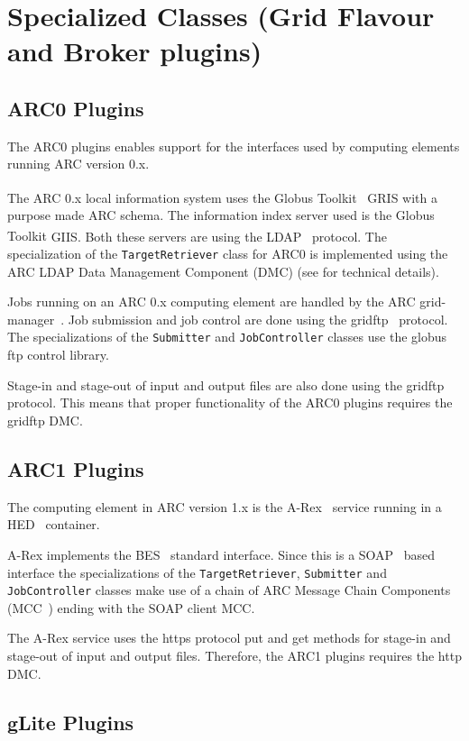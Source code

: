 \documentclass{book}
\newcommand{\GT}{Globus Toolkit\textsuperscript{\textregistered}}
\newcommand{\JobController}{\texttt{JobController}}
\newcommand{\TargetRetriever}{\texttt{TargetRetriever}}
\newcommand{\Submitter}{\texttt{Submitter}}
\begin{document}
\section{Specialized Classes (Grid Flavour and Broker plugins)}
\label{sec:plugins}

\subsection{ARC0 Plugins}

The ARC0 plugins enables support for the interfaces used by computing
elements running ARC version 0.x.

The ARC 0.x local information system uses the {\GT}~\cite{globus} GRIS
with a purpose made ARC schema. The information index server used is the
{\GT} GIIS. Both these servers are using the LDAP~\cite{ldap}
protocol. The specialization of the {\TargetRetriever} class for ARC0
is implemented using the ARC LDAP Data Management Component (DMC) (see
\cite{hed} for technical details).

Jobs running on an ARC 0.x computing element are handled by the ARC
grid-manager~\cite{gm}. Job submission and job control are done using
the gridftp~\cite{gridftp} protocol. The specializations of the
{\Submitter} and {\JobController} classes use the globus ftp control
library.

Stage-in and stage-out of input and output files are also done using
the gridftp~\cite{gridftp} protocol. This means that proper
functionality of the ARC0 plugins requires the gridftp DMC.

\subsection{ARC1 Plugins}

The computing element in ARC version 1.x is the A-Rex~\cite{arex}
service running in a HED~\cite{hed} container.

A-Rex implements the BES~\cite{ogsa-bes} standard interface. Since
this is a SOAP~\cite{soap} based interface the specializations of the
{\TargetRetriever}, {\Submitter} and {\JobController} classes make use
of a chain of ARC Message Chain Components (MCC~\cite{hed}) ending
with the SOAP client MCC.

The A-Rex service uses the https protocol put and get methods for
stage-in and stage-out of input and output files. Therefore, the ARC1
plugins requires the http DMC.

\subsection{gLite Plugins}
\end{document}

